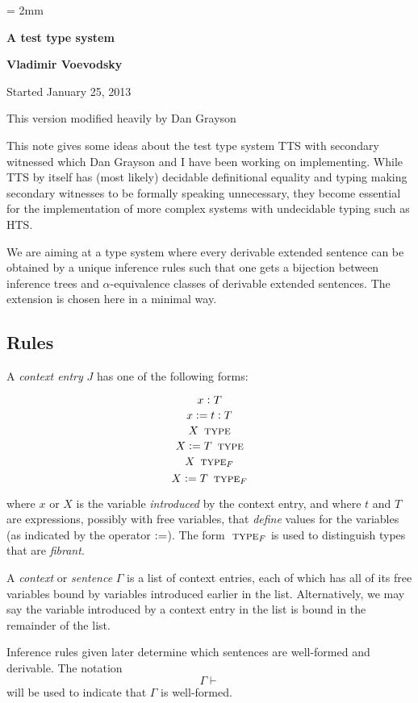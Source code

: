 \documentclass[11pt]{article}
\newcommand{\hastype}{\vcentcolon}
\newcommand{\TYPE}{\mathop{\text{ \sc type}}}
\newcommand{\FTYPE}{\mathop{\text{ \sc type}_F}}
\newcommand{\Okay}{\mathop{\text{ \sc okay}}}
\newcommand{\Context}{\vdash\Okay}
\renewcommand{\Context}{\vdash}
\newcommand{\defn}{\vcentcolon=}
\begin{document}
\parskip = 2mm
\begin{center}
{\bf\Large A test type system}

{\bf Vladimir Voevodsky}

{Started January 25, 2013}  

{This version modified heavily by Dan Grayson}  
\end{center}

\tableofcontents

This note gives some ideas about the test type system TTS with secondary
witnessed which Dan Grayson and I have been working on implementing. While TTS
by itself has (most likely) decidable definitional equality and typing making
secondary witnesses to be formally speaking unnecessary, they become essential
for the implementation of more complex systems with undecidable typing such as
HTS.

We are aiming at a type system where every derivable extended sentence can be
obtained by a unique inference rules such that one gets a bijection between
inference trees and $\alpha$-equivalence classes of derivable extended
sentences.  The extension is chosen here in a minimal way.

\subsection{Rules}

A {\em context entry} $J$ has one of the following forms:

$$ x \hastype T $$
$$ x \defn t \hastype T $$
$$ X \TYPE $$
$$ X \defn T \TYPE $$
$$ X \FTYPE $$
$$ X \defn T \FTYPE $$

where $x$ or $X$ is the variable {\em introduced} by the context entry, and
where $t$ and $T$ are expressions, possibly with free variables, that {\em
  define} values for the variables (as indicated by the operator $\defn$).  The
form $\FTYPE$ is used to distinguish types that are {\em fibrant}.

A {\em context} or {\em sentence} $\Gamma$ is a list of context entries, each of
which has all of its free variables bound by variables introduced earlier in
the list.  Alternatively, we may say the variable introduced by a context entry in
the list is bound in the remainder of the list.

Inference rules given later determine which sentences are well-formed and
derivable.  The notation $$\Gamma \Context$$ will be used to indicate that
$\Gamma$ is well-formed.
\end{document}

